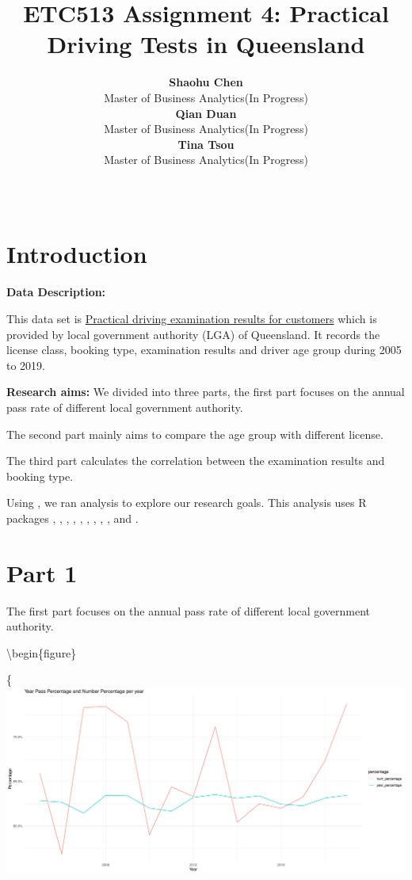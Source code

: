 \documentclass[11pt,a4paper,]{article}
\title{ETC513 Assignment 4: Practical Driving Tests in Queensland}
\author{\sf\Large\textbf{ Shaohu Chen}\\ {\sf\large Master of Business Analytics(In Progress)\\[0.5cm]} \sf\Large\textbf{ Qian Duan}\\ {\sf\large Master of Business Analytics(In Progress)\\[0.5cm]} \sf\Large\textbf{ Tina Tsou}\\ {\sf\large Master of Business Analytics(In Progress)\\[0.5cm]}}
\date{\sf\Date~\Month~\Year}
\makeatletter
\def\titlepage{\front{\expandafter{\@title}}{\@author}{\@organization}}
\makeatother
\begin{document}
\titlepage

\section*{Introduction}

\textbf{Data Description:}

This data set is \href{https://data.gov.au/dataset/ds-qld-3f90a4c3-23df-49dc-b243-9a29c0b23dd5/details?q=Practical\%20driving}{Practical driving examination results for customers} which is provided by local government authority (LGA) of Queensland. It records the license class, booking type, examination results and driver age group during 2005 to 2019.

\textbf{Research aims:}
We divided into three parts, the first part focuses on the annual pass rate of different local government authority.

The second part mainly aims to compare the age group with different license.

The third part calculates the correlation between the examination results and booking type.

Using \textcite{R}, we ran analysis to explore our research goals. This analysis uses R packages \textcite{tidyverse}, \textcite{readr}, \textcite{kableExtra}, \textcite{bookdown}, \textcite{ggplot2}, \textcite{fastDummies}, \textcite{scales}, \textcite{stargazer}, \textcite{broom}, and \textcite{pROC}.

\section*{Part 1}

The first part focuses on the annual pass rate of different local government authority.

\textbackslash begin\{figure\}

\{\centering \includegraphics{Assignment4_files/figure-latex/Fig1-1}
\end{document}
